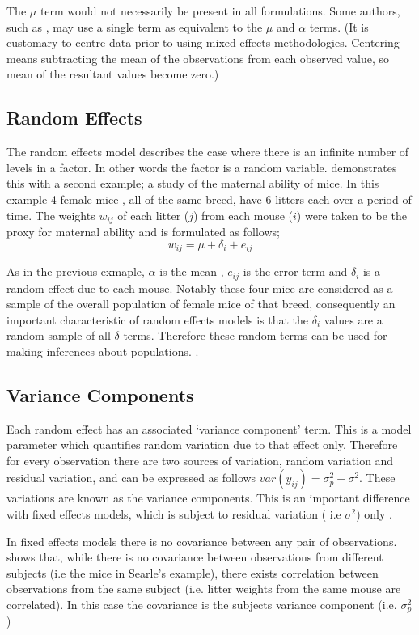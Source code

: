 \documentclass[12pt, a4paper]{report}
\begin{document}
 The $\mu$ term would not
necessarily be present in all formulations. Some authors, such as
\citet{Demi}, may use a single term as equivalent to the $\mu$ and
$\alpha$ terms. (It is customary to centre data prior to using
mixed effects methodologies. Centering means subtracting the mean
of the observations from each observed value, so mean of the
resultant values become zero.)

\subsection{Random Effects}
The random effects model describes the case where there is an
infinite number of levels in a factor. In other words the factor
is a random variable. \citet{Searle} demonstrates this with a
second example; a study of the maternal ability of mice. In this
example 4 female mice , all of the same breed, have 6 litters each
over a period of time. The weights $w_{ij}$ of each litter ($j$)
from each mouse ($i$) were taken to be the proxy for maternal
ability and is formulated as follows;
\begin{equation}
w_{ij} = \mu + \delta_{i} + e_{ij}
\end{equation}

As in the previous exmaple, $\alpha$ is the mean , $e_{ij}$ is the
error term and $\delta_{i}$ is a random effect due to each mouse.
Notably these four mice are considered as a sample of the overall
population of female mice of that breed, consequently an important
characteristic of random effects models is that the $\delta_{i}$
values are a random sample of all $\delta$ terms. Therefore these
random terms can be used for making inferences about populations.
\citep{McCullSearle}.

\subsection{Variance Components}
Each random effect has an associated `variance component' term.
This is a model parameter which quantifies random variation due to
that effect only. Therefore for every observation there are two
sources of variation, random variation and residual variation, and
can be expressed as follows $var(y_{ij})=\sigma^{2}_{p} +
\sigma^{2}$. These variations are known as the variance
components. This is an important difference with fixed effects
models, which is subject to residual variation ( i.e $\sigma^{2}$)
only \citep{BrownPrescott}.

In fixed effects models there is no covariance between any pair of
observations. \citet*{BrownPrescott} shows that, while there is no
covariance between observations from different subjects (i.e the
mice in Searle's example), there exists correlation between
observations from the same subject (i.e. litter weights from the
same mouse are correlated). In this case the covariance is the
subjects variance component (i.e. $\sigma^{2}_{p}$)
\end{document}
